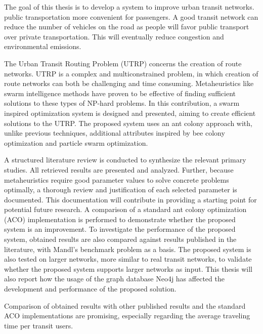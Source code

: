 

The goal of this thesis is to develop a system to improve urban transit networks.  public transportation more convenient for passengers. A good transit network can reduce the number of vehicles on the road as people will favor public transport over private transportation. This will eventually reduce congestion and environmental emissions.

The Urban Transit Routing Problem (UTRP) concerns the creation of route networks. UTRP is a complex and multiconstrained problem, in which creation of route networks can both be challenging and time consuming. Metaheuristics like swarm intelligence methods have proven to be effective of finding sufficient solutions to these types of NP-hard problems. In this contribution, a swarm inspired optimization system is designed and presented, aiming to create efficient solutions to the UTRP. The proposed system uses an ant colony approach with, unlike previous techniques, additional attributes inspired by bee colony optimization and particle swarm optimization. 

A structured literature review is conducted to synthesize the relevant primary studies. All retrieved results are presented and analyzed. Further, because metaheuristics require good parameter values to solve concrete problems optimally, a thorough review and justification of each selected parameter is documented. This documentation will contribute in providing a starting point for potential future research. A comparison of a standard ant colony optimization (ACO) implementation is performed to demonstrate whether the proposed system is an improvement. To investigate the performance of the proposed system, obtained results are also compared against results published in the literature, with Mandl's benchmark problem as a basis.  The proposed system is also tested on larger networks, more similar to real transit networks, to validate whether the proposed system supports larger networks as input. This thesis will also report how the usage of the graph database Neo4j has affected the development and performance of the proposed solution.  

Comparison of obtained results with other published results and the standard ACO implementations are promising, especially regarding the average traveling time per transit users. 



